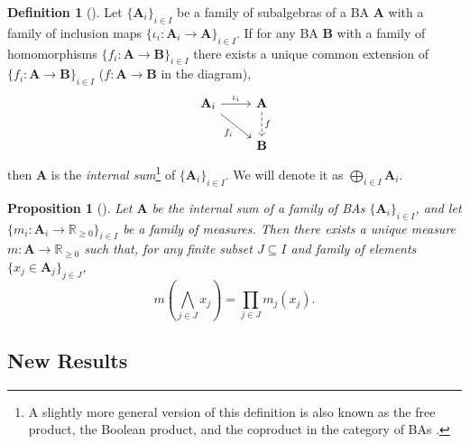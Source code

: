 \documentclass{article}
\newtheorem{proposition}{Proposition}
\theoremstyle{definition}
\newtheorem{definition}{Definition}
\theoremstyle{remark}
\begin{document}
\begin{definition}[\cite{givant2008introduction}]
  Let $\{ \mathbf{A}_i \}_{i \in I}$ be a family of subalgebras of a BA
  $\mathbf{A}$ with a family of inclusion maps $\{ \iota_i\colon \mathbf{A}_i
  \to \mathbf{A} \}_{i \in I}$. If for any BA $\mathbf{B}$ with a family of
  homomorphisms $\{ f_i\colon \mathbf{A} \to \mathbf{B} \}_{i \in I}$ there
  exists a unique common extension of $\{ f_i\colon \mathbf{A} \to \mathbf{B}
  \}_{i \in I}$ ($f\colon \mathbf{A} \to \mathbf{B}$ in the diagram),
  \[
    \begin{tikzcd}
      \mathbf{A}_i \arrow{r}{\iota_i} \arrow{rd}[swap]{f_i} & \mathbf{A} \arrow[d,dashed,"f"] \\
      & \mathbf{B}
    \end{tikzcd}
  \]
  then $\mathbf{A}$ is the \emph{internal sum}\footnote{A slightly more general
    version of this definition is also known as the free product, the Boolean
    product, and the coproduct in the category of BAs
    \cite{givant2008introduction,koppelberg1989handbook,sikorski1969boolean}.}
  of $\{\mathbf{A}_i \}_{i \in I}$. We will denote it as $\bigoplus_{i \in I}
  \mathbf{A}_i$.
\end{definition}

\begin{proposition}[\cite{sikorski1969boolean}]
  Let $\mathbf{A}$ be the internal sum of a family of BAs $\{ \mathbf{A}_i \}_{i
    \in I}$, and let $\{m_i\colon \mathbf{A}_i \to \mathbb{R}_{\ge 0} \}_{i \in
    I}$ be a family of measures. Then there exists a unique measure $m\colon
  \mathbf{A} \to \mathbb{R}_{\ge 0}$ such that, for any finite subset $J
  \subseteq I$ and family of elements $\{ x_j \in \mathbf{A}_j \}_{j \in J}$,
  \[
    m \left( \bigwedge_{j \in J} x_j \right) = \prod_{j \in J} m_j(x_j).
  \]
\end{proposition}

\subsection{New Results}



\end{document}
